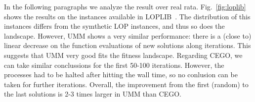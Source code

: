 \documentclass[runningheads]{llncs}
\begin{document}


In the following paragraphs we analyze the result over real rata. Fig.~\ref{fig:loplib} shows the results on the instances available in LOPLIB~\citep{}. The distribution of this instances differs from the symthetic LOP instances, and thus so does the landscape. However, UMM shows a very similar performance: there is a (close to) linear decrease on the function evaluations of new solutions along iterations. This suggests that UMM very good fits the fitness landscape. Regarding CEGO, we can take similar conclussions for the first 50-100 iterations. However, the processes had to be halted after hitting the wall time, so no conlusion can be taken for further iterations. Overall, the improvement from the first (random) to the last solutions is 2-3 times larger in UMM than CEGO.
\end{document}
